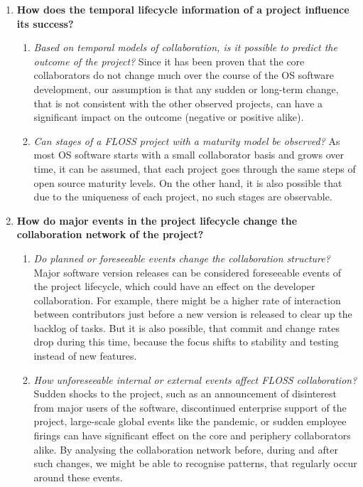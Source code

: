 \begin{enumerate}
    \item \textbf{How does the temporal lifecycle information of a project influence its success?} \\
    
    \begin{enumerate}
        \item \textit{Based on temporal models of collaboration, is it possible to predict the outcome of the project?} Since it has been proven that the core collaborators do not change much over the course of the OS software development, our assumption is that any sudden or long-term change, that is not consistent with the other observed projects, can have a significant impact on the outcome (negative or positive alike).
        \item \textit{Can stages of a FLOSS project with a maturity model be observed?} As most OS software starts with a small collaborator basis and grows over time, it can be assumed, that each project goes through the same steps of open source maturity levels. On the other hand, it is also possible that due to the uniqueness of each project, no such stages are observable. 
    \end{enumerate}

    \item \textbf{How do major events in the project lifecycle change the collaboration network of the project?}
    \begin{enumerate}
        \item \textit{Do planned or foreseeable events change the collaboration structure?} Major software version releases can be considered foreseeable events of the project lifecycle, which could have an effect on the developer collaboration. For example, there might be a higher rate of interaction between contributors just before a new version is released to clear up the backlog of tasks. But it is also possible, that commit and change rates drop during this time, because the focus shifts to stability and testing instead of new features.
        \item \textit{How unforeseeable internal or external events affect FLOSS collaboration?} Sudden shocks to the project, such as an announcement of disinterest from major users of the software, discontinued enterprise support of the project, large-scale global events like the pandemic, or sudden employee firings can have significant effect on the core and periphery collaborators alike. By analysing the collaboration network before, during and after such changes, we might be able to recognise patterns, that regularly occur around these events.
    \end{enumerate}
\end{enumerate}

